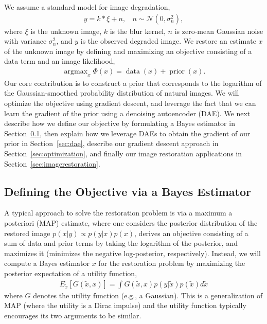 \documentclass{article}
\DeclareMathOperator*{\argmax}{argmax}
\DeclareMathOperator*{\data}{data}
\DeclareMathOperator*{\prior}{prior}
\begin{document}
We assume a standard model for image degradation, 
\begin{align}
y = k * \xi + n, \ \ \ \ n \sim \mathcal{N}(0,\sigma_{n}^2),
\end{align}
where $\xi$ is the unknown image, $k$ is the blur kernel, $n$ is zero-mean Gaussian noise with variance $\sigma_{n}^2$, and $y$ is the observed degraded image.  We restore an estimate $x$ of the unknown image by defining and maximizing an objective consisting of a data term and an image likelihood,
\begin{align}
\argmax_x \Phi(x) = \data(x) + \prior(x).
\end{align}
Our core contribution is to construct a prior that corresponds to the logarithm of the Gaussian-smoothed probability distribution of natural images. We will optimize the objective using gradient descent, and leverage the fact that we can learn the gradient of the prior using a denoising autoencoder (DAE). We next describe how we define our objective by formulating a Bayes estimator in Section~\ref{sec:bayesrisk}, then explain how we leverage DAEs to obtain the gradient of our prior in Section~\ref{sec:dae}, describe our gradient descent approach in Section~\ref{sec:optimization}, and finally our image restoration applications in Section~\ref{sec:imagerestoration}.

\subsection{Defining the Objective via a Bayes Estimator}
\label{sec:bayesrisk}

A typical approach to solve the restoration problem is via a maximum a posteriori (MAP) estimate, where one considers the posterior distribution of the restored image $p(x|y) \propto p(y|x)p(x)$, derives an objective consisting of a sum of data and prior terms by taking the logarithm of the posterior, and maximizes it (minimizes the negative log-posterior, respectively). Instead, we will compute a Bayes estimator $x$ for the restoration problem by maximizing the posterior expectation of a utility function,
\begin{align}
\label{eq:PEU}
E_{\tilde{x}}[G(\tilde{x},x)] = \int G(\tilde{x},x) p(y|\tilde{x})p(\tilde{x})d\tilde{x}
\end{align}
where $G$ denotes the utility function (e.g., a Gaussian). This is a generalization of MAP (where the utility is a Dirac impulse) and the utility function typically encourages its two arguments to be similar.
\end{document}
